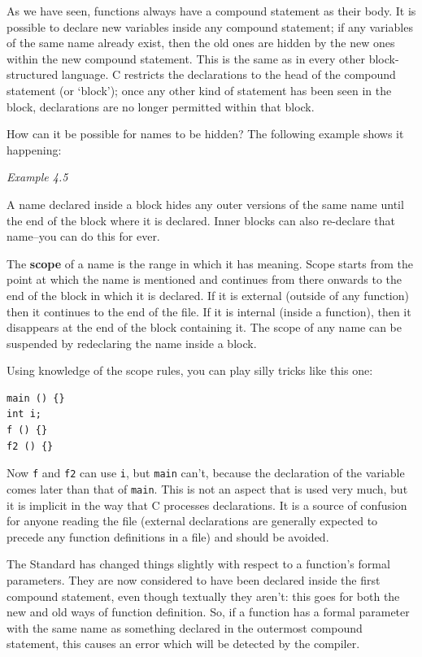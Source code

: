    As we have seen, functions always have a compound statement as their
    body. It is possible to declare new variables inside any compound
    statement; if any variables of the same name already exist, then the old
    ones are hidden by the new ones within the new compound statement. This
    is the same as in every other block-structured language. C restricts the
    declarations to the head of the compound statement (or `block');
    once any other kind of statement has been seen in the block,
    declarations are no longer permitted within that block.


   How can it be possible for names to be hidden? The following example
    shows it happening:

    \begin{center}\textit{Example 4.5}\end{center}

   A name declared inside a block hides any outer versions of the same
    name until the end of the block where it is declared. Inner blocks can
    also re-declare that name--you can do this for ever.


   The \textbf{scope} of a name is the range in which it has meaning.
    Scope starts from the point at which the name is mentioned and continues
    from there onwards to the end of the block in which it is declared. If
    it is external (outside of any function) then it continues to the end of
    the file. If it is internal (inside a function), then it disappears at
    the end of the block containing it. The scope of any name can be
    suspended by redeclaring the name inside a block.


   Using knowledge of the scope rules, you can play silly tricks like
    this one:

\begin{Verbatim}
main () {}
int i;
f () {}
f2 () {}
\end{Verbatim}

   Now \texttt{f} and \texttt{f2} can use \texttt{i}, but
    \texttt{main} can't, because the declaration of the variable comes
    later than that of \texttt{main}. This is not an aspect that is used
    very much, but it is implicit in the way that C processes declarations.
    It is a source of confusion for anyone reading the file (external
    declarations are generally expected to precede any function definitions
    in a file) and should be avoided.


   The Standard has changed things slightly with respect to a function's
    formal parameters. They are now considered to have been declared inside
    the first compound statement, even though textually they aren't: this
    goes for both the new and old ways of function definition. So, if a
    function has a formal parameter with the same name as something declared
    in the outermost compound statement, this causes an error which will be
    detected by the compiler.


